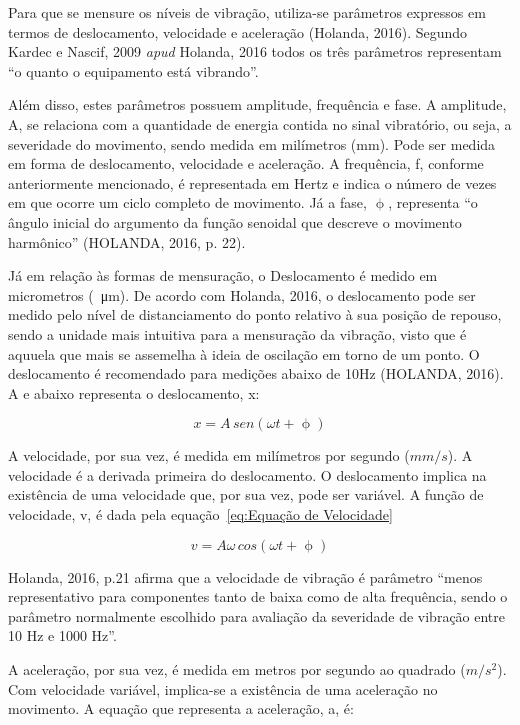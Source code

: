 \documentclass[
	12pt,				
	oneside,			
	a4paper,			
	english,			
	brazil,			
	]{abntex2ppgsi}
\begin{document}
Para que se mensure os níveis de vibração, utiliza-se parâmetros expressos em termos de deslocamento, velocidade e aceleração (Holanda, 2016). Segundo Kardec e Nascif, 2009 \textit{apud} Holanda, 2016 todos os três parâmetros representam “o quanto o equipamento está vibrando”. 

Além disso, estes parâmetros possuem amplitude, frequência e fase. A amplitude, A, se relaciona com a quantidade de energia contida no sinal vibratório, ou seja, a severidade do movimento, sendo medida em milímetros (mm). Pode ser medida em forma de deslocamento, velocidade e aceleração. A frequência, f, conforme anteriormente mencionado, é representada em Hertz e indica o número de vezes em que ocorre um ciclo completo de movimento. Já a fase, $\upphi$, representa “o ângulo inicial do argumento da função senoidal que descreve o movimento harmônico” (HOLANDA, 2016, p. 22).

Já em relação às formas de mensuração, o Deslocamento é medido em micrometros (\SI{}{\micro\metre}). De acordo com Holanda, 2016, o deslocamento pode ser medido pelo nível de distanciamento do ponto relativo à sua posição de repouso, sendo a unidade mais intuitiva para a mensuração da vibração, visto que é aquuela que mais se assemelha à ideia de oscilação em torno de um ponto. O deslocamento é recomendado para medições abaixo de 10Hz (HOLANDA, 2016). A e abaixo representa o deslocamento, x:

\begin{equation}
	x = A \,sen (\omega t + \upphi)
	\label{eq:Equação de deslocamento}
\end{equation}

A velocidade, por sua vez, é medida em milímetros por segundo ($mm/s$). A velocidade é a derivada primeira do deslocamento. O deslocamento implica na existência de uma velocidade que, por sua vez, pode ser variável. A função de velocidade, v, é dada pela equação~\ref{eq:Equação de Velocidade}

\begin{equation}
	v = A\omega \,cos (\omega t + \upphi)
	\label{eq:Equação de Velocidade}
\end{equation}

Holanda, 2016, p.21 afirma que a velocidade de vibração é parâmetro “menos representativo para componentes tanto de baixa como de alta frequência, sendo o parâmetro normalmente escolhido para avaliação da severidade de vibração entre 10 Hz e 1000 Hz”.

A aceleração, por sua vez, é medida em metros por segundo ao quadrado ($m/s^{2}$). Com velocidade variável, implica-se a existência de uma aceleração no movimento. A equação que representa a aceleração, a, é:
\end{document}

